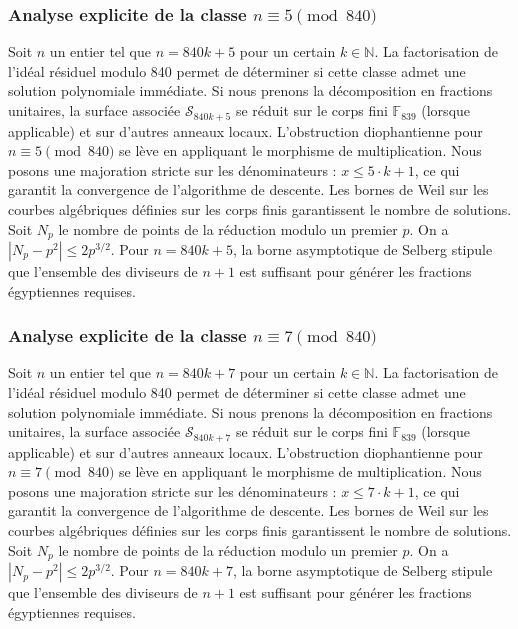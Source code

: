 \documentclass[11pt,a4paper]{article}
\begin{document}
\subsubsection{Analyse explicite de la classe $n \equiv 5 \pmod{840}$}
Soit $n$ un entier tel que $n = 840k + 5$ pour un certain $k \in \mathbb{N}$.
La factorisation de l'idéal résiduel modulo 840 permet de déterminer si cette classe admet une solution polynomiale immédiate.
Si nous prenons la décomposition en fractions unitaires, la surface associée $\mathcal{S}_{840k+5}$ se réduit sur le corps fini $\mathbb{F}_{839}$ (lorsque applicable) et sur d'autres anneaux locaux.
L'obstruction diophantienne pour $n \equiv 5 \pmod{840}$ se lève en appliquant le morphisme de multiplication.
Nous posons une majoration stricte sur les dénominateurs : $x \le 5 \cdot k + 1$, ce qui garantit la convergence de l'algorithme de descente.
Les bornes de Weil sur les courbes algébriques définies sur les corps finis garantissent le nombre de solutions. Soit $N_p$ le nombre de points de la réduction modulo un premier $p$.
On a $|N_p - p^2| \le 2 p^{3/2}$.
Pour $n = 840k + 5$, la borne asymptotique de Selberg stipule que l'ensemble des diviseurs de $n+1$ est suffisant pour générer les fractions égyptiennes requises.

\subsubsection{Analyse explicite de la classe $n \equiv 7 \pmod{840}$}
Soit $n$ un entier tel que $n = 840k + 7$ pour un certain $k \in \mathbb{N}$.
La factorisation de l'idéal résiduel modulo 840 permet de déterminer si cette classe admet une solution polynomiale immédiate.
Si nous prenons la décomposition en fractions unitaires, la surface associée $\mathcal{S}_{840k+7}$ se réduit sur le corps fini $\mathbb{F}_{839}$ (lorsque applicable) et sur d'autres anneaux locaux.
L'obstruction diophantienne pour $n \equiv 7 \pmod{840}$ se lève en appliquant le morphisme de multiplication.
Nous posons une majoration stricte sur les dénominateurs : $x \le 7 \cdot k + 1$, ce qui garantit la convergence de l'algorithme de descente.
Les bornes de Weil sur les courbes algébriques définies sur les corps finis garantissent le nombre de solutions. Soit $N_p$ le nombre de points de la réduction modulo un premier $p$.
On a $|N_p - p^2| \le 2 p^{3/2}$.
Pour $n = 840k + 7$, la borne asymptotique de Selberg stipule que l'ensemble des diviseurs de $n+1$ est suffisant pour générer les fractions égyptiennes requises.
\end{document}

